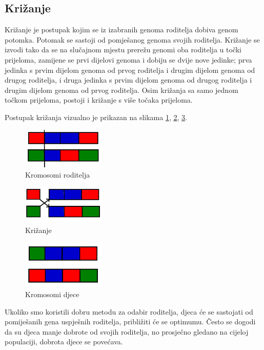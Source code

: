 \documentclass[times, utf8, zavrsni]{fer}
\begin{document}
\subsection{Križanje}
Križanje je postupak kojim se iz izabranih genoma roditelja dobiva genom potomka. Potomak se sastoji od pomješanog genoma svojih roditelja. Križanje se izvodi tako da se na slučajnom mjestu prerežu genomi oba roditelja u točki prijeloma, zamijene se prvi dijelovi genoma i dobiju se dvije nove jedinke; prva jedinka s prvim dijelom genoma od prvog roditelja i drugim dijelom genoma od drugog roditelja, i druga jedinka s prvim dijelom genoma od drugog roditelja i drugim dijelom genoma od prvog roditelja. Osim križanja sa samo jednom točkom prijeloma, postoji i križanje s više točaka prijeloma. 

Postupak križanja vizualno je prikazan na slikama \ref{fig:kromosomi roditelja}, \ref{fig:krizanje}, \ref{fig:kromosomi djece}.

\begin{figure}[htb]
\centering
\includegraphics[width=4cm]{images/kromosomi_roditelja.png}
\caption{Kromosomi roditelja}
\label{fig:kromosomi roditelja}
\end{figure}

\begin{figure}[htb]
\centering
\includegraphics[width=4cm]{images/krizanje.png}
\caption{Križanje}
\label{fig:krizanje}
\end{figure}

\begin{figure}[htb]
\centering
\includegraphics[width=4cm]{images/kromosomi_djece.png}
\caption{Kromosomi djece}
\label{fig:kromosomi djece}
\end{figure}

Ukoliko smo koristili dobru metodu za odabir roditelja, djeca će se sastojati od pomiješanih gena uspješnih roditelja, približiti će se optimumu. Često se dogodi da su djeca manje dobrote od svojih roditelja, no prosječno gledano na cijeloj populaciji, dobrota djece se povećava.
\end{document}
